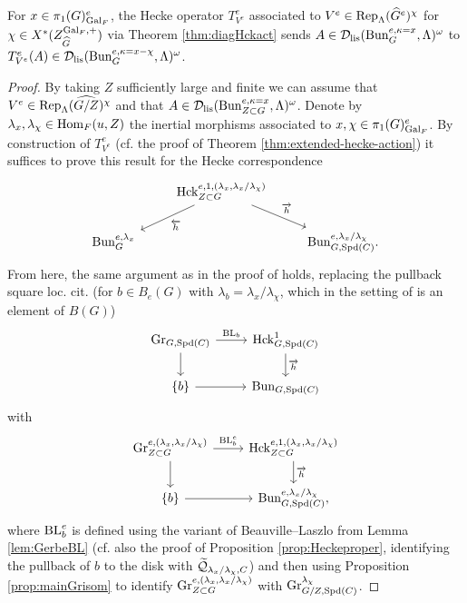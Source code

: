 \begin{lem}\label{lem:Konradlem1}
For $x \in \pi_{1}(G)^{e}_{\mathrm{Gal}_{F}}$, the Hecke operator $T^{e}_{V^{e}}$ associated to $V^{e} \in \mathrm{Rep}_{\Lambda}(\widehat{G}^{e})^{\chi}$ for $\chi \in X^{*}(Z_{\widehat{G}}^{\mathrm{Gal}_{F},+})$ via Theorem \ref{thm:diagHckact} sends $A \in \mathcal{D}_{\textnormal{lis}}(\mathrm{Bun}_{G}^{e,\kappa=x}, \Lambda)^{\omega}$ to $T^{e}_{V^{e}}(A)\in \mathcal{D}_{\textnormal{lis}}(\mathrm{Bun}_{G}^{e,\kappa= x-\chi}, \Lambda)^{\omega}$.
\end{lem}

\begin{proof}
    By taking $Z$ sufficiently large and finite we can assume that $V^{e} \in \mathrm{Rep}_{\Lambda}(\widehat{G/Z})^{\chi}$ and that $A \in \mathcal{D}_{\textnormal{lis}}(\mathrm{Bun}_{Z \subset G}^{e,\kappa=x}, \Lambda)^{\omega}$. Denote by $\lambda_{x},\lambda_{\chi} \in \mathrm{Hom}_{F}(u,Z)$ the inertial morphisms associated to $x,\chi \in \pi_{1}(G)^{e}_{\mathrm{Gal}_{F}}$. By construction of $T^{e}_{V^{e}}$ (cf. the proof of Theorem \ref{thm:extended-hecke-action}) it suffices to prove this result for the Hecke correspondence 
    \[
\begin{tikzcd}
  &  \Hck_{Z \subset G}^{e,1,(\lambda_{x},\lambda_{x}/\lambda_{\chi})} \arrow["\overleftarrow{h}"]{ld} \arrow["\overrightarrow{h}"]{rd} & \\
  \Bun_{G}^{e,\lambda_{x}} & & \Bun_{G,\Spd(C)}^{e,\lambda_{x}/\lambda_{\chi}}.
\end{tikzcd}
\]
From here, the same argument as in the proof of \cite[Lemma 5.3.2]{Zou24} holds, replacing the pullback square loc. cit. (for $b \in B_{e}(G)$ with $\lambda_{b}=\lambda_{x}/\lambda_{\chi}$, which in the setting of \cite{Zou24} is an element of $B(G)$)
\[
\begin{tikzcd}
    \tn{Gr}_{G,\Spd(C)} \arrow["\tn{BL}_{b}"]{r} \arrow{d} & \Hck_{G,\Spd(C)}^{1} \arrow["\overrightarrow{h}"]{d} \\
    \{b\} \arrow{r} & \Bun_{G,\Spd(C)}
\end{tikzcd}
\]
with
\[
   \begin{tikzcd}
    \tn{Gr}_{Z \subset G}^{e,(\lambda_{x},\lambda_{x}/\lambda_{\chi})} \arrow["\tn{BL}^{e}_{b}"]{r} \arrow{d} & \Hck_{Z \subset G}^{e,1,(\lambda_{x},\lambda_{x}/\lambda_{\chi})} \arrow["\overrightarrow{h}"]{d} \\
    \{b\} \arrow{r} & \Bun_{G,\Spd(C)}^{e,\lambda_{x}/\lambda_{\chi}},
\end{tikzcd}
\]
where $\textnormal{BL}_{b}^{e}$ is defined using the variant of Beauville--Laszlo from Lemma \ref{lem:GerbeBL} (cf. also the proof of Proposition \ref{prop:Heckeproper}, identifying the pullback of $b$ to the disk with $\widetilde{\mathcal{Q}}_{\lambda_{x}/\lambda_{\chi},C}$) and then using Proposition \ref{prop:mainGrisom} to identify $\textnormal{Gr}_{Z \subset G}^{e,(\lambda_{x},\lambda_{x}/\lambda_{\chi})}$ with $\textnormal{Gr}_{G/Z,\mathrm{Spd}(C)}^{\lambda_{\chi}}$.
\end{proof}

